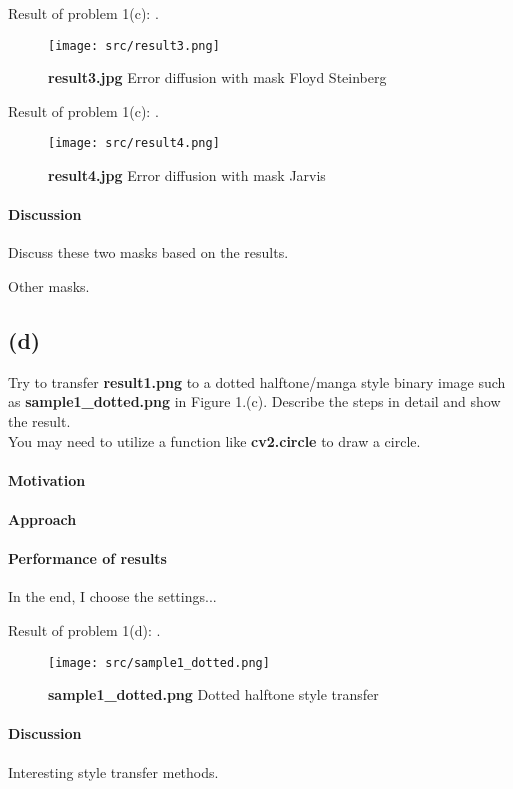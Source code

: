 Result of problem 1(c): .
\begin{figure}
    \centering
    \texttt{[image: src/result3.png]}
    \caption{\textbf{result3.jpg} Error diffusion with mask Floyd Steinberg}
    \label{result3}
\end{figure}

Result of problem 1(c): .
\begin{figure}
    \centering
    \texttt{[image: src/result4.png]}
    \caption{\textbf{result4.jpg} Error diffusion with mask Jarvis}
    \label{result4}
\end{figure}

\paragraph{Discussion}
Discuss these two masks based on the results.

Other masks.

\subsection{(d)}\label{1_d}
Try to transfer \textbf{result1.png} to a dotted halftone/manga style binary image such as \textbf{sample1\_dotted.png} in Figure 1.(c). Describe the steps in detail and show the result. \\
You may need to utilize a function like \textbf{cv2.circle} to draw a circle.

\paragraph{Motivation}

\paragraph{Approach}

\paragraph{Performance of results}
In the end, I choose the \alert{settings}...

Result of problem 1(d): .
\begin{figure}
    \centering
    \texttt{[image: src/sample1\_dotted.png]}
    \caption{\textbf{sample1\_dotted.png} Dotted halftone style transfer}
    \label{sample1dotted.png}
\end{figure}

\paragraph{Discussion}
Interesting style transfer methods.
